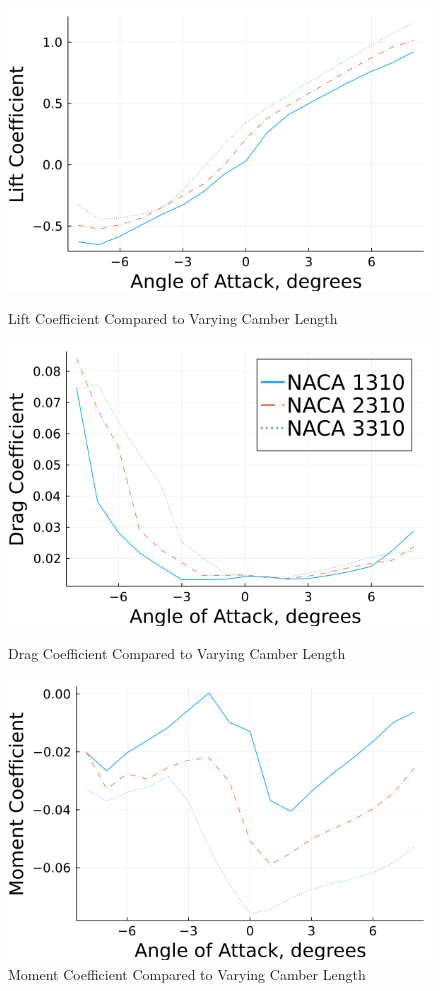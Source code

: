 \documentclass{article}
\begin{document}
\begin{figure}[!htb]
  \includegraphics[width=\linewidth]{Figure1.png}
  \caption{Lift Coefficient Compared to Varying Camber Length}\label{fig:1}
\endminipage\hfill
{}
  \includegraphics[width=\linewidth]{Figure2.png}
  \caption{Drag Coefficient Compared to Varying Camber Length}\label{fig:2}
\endminipage\hfill
{}
  \includegraphics[width=\linewidth]{Figure3.png}
  \caption{Moment Coefficient Compared to Varying Camber Length}\label{fig:3}
\endminipage
\end{figure}
\end{document}
